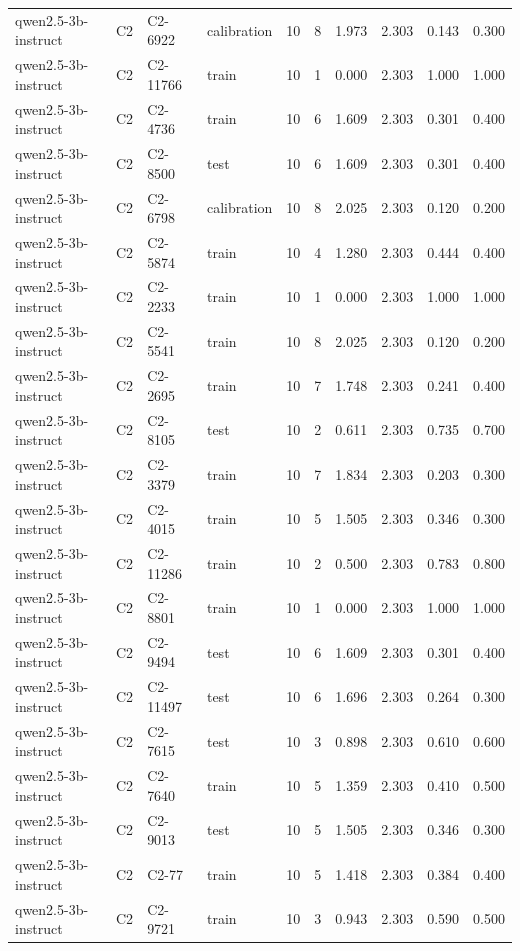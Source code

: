 \begin{table}
\begin{tabular}{llllrrrrrr}
qwen2.5-3b-instruct & C2 & C2-6922 & calibration & 10 & 8 & 1.973 & 2.303 & 0.143 & 0.300 \\
qwen2.5-3b-instruct & C2 & C2-11766 & train & 10 & 1 & 0.000 & 2.303 & 1.000 & 1.000 \\
qwen2.5-3b-instruct & C2 & C2-4736 & train & 10 & 6 & 1.609 & 2.303 & 0.301 & 0.400 \\
qwen2.5-3b-instruct & C2 & C2-8500 & test & 10 & 6 & 1.609 & 2.303 & 0.301 & 0.400 \\
qwen2.5-3b-instruct & C2 & C2-6798 & calibration & 10 & 8 & 2.025 & 2.303 & 0.120 & 0.200 \\
qwen2.5-3b-instruct & C2 & C2-5874 & train & 10 & 4 & 1.280 & 2.303 & 0.444 & 0.400 \\
qwen2.5-3b-instruct & C2 & C2-2233 & train & 10 & 1 & 0.000 & 2.303 & 1.000 & 1.000 \\
qwen2.5-3b-instruct & C2 & C2-5541 & train & 10 & 8 & 2.025 & 2.303 & 0.120 & 0.200 \\
qwen2.5-3b-instruct & C2 & C2-2695 & train & 10 & 7 & 1.748 & 2.303 & 0.241 & 0.400 \\
qwen2.5-3b-instruct & C2 & C2-8105 & test & 10 & 2 & 0.611 & 2.303 & 0.735 & 0.700 \\
qwen2.5-3b-instruct & C2 & C2-3379 & train & 10 & 7 & 1.834 & 2.303 & 0.203 & 0.300 \\
qwen2.5-3b-instruct & C2 & C2-4015 & train & 10 & 5 & 1.505 & 2.303 & 0.346 & 0.300 \\
qwen2.5-3b-instruct & C2 & C2-11286 & train & 10 & 2 & 0.500 & 2.303 & 0.783 & 0.800 \\
qwen2.5-3b-instruct & C2 & C2-8801 & train & 10 & 1 & 0.000 & 2.303 & 1.000 & 1.000 \\
qwen2.5-3b-instruct & C2 & C2-9494 & test & 10 & 6 & 1.609 & 2.303 & 0.301 & 0.400 \\
qwen2.5-3b-instruct & C2 & C2-11497 & test & 10 & 6 & 1.696 & 2.303 & 0.264 & 0.300 \\
qwen2.5-3b-instruct & C2 & C2-7615 & test & 10 & 3 & 0.898 & 2.303 & 0.610 & 0.600 \\
qwen2.5-3b-instruct & C2 & C2-7640 & train & 10 & 5 & 1.359 & 2.303 & 0.410 & 0.500 \\
qwen2.5-3b-instruct & C2 & C2-9013 & test & 10 & 5 & 1.505 & 2.303 & 0.346 & 0.300 \\
qwen2.5-3b-instruct & C2 & C2-77 & train & 10 & 5 & 1.418 & 2.303 & 0.384 & 0.400 \\
qwen2.5-3b-instruct & C2 & C2-9721 & train & 10 & 3 & 0.943 & 2.303 & 0.590 & 0.500 \\

\end{tabular}
\end{table}
